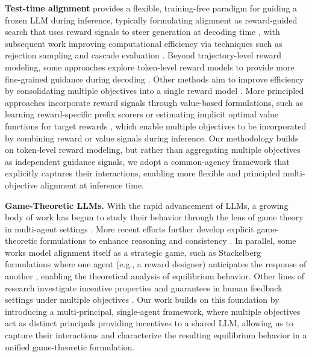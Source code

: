 \documentclass{article}
\begin{document}
\textbf{Test-time alignment} provides a flexible, training-free paradigm for guiding a frozen LLM during inference, typically formulating alignment as reward-guided search that uses reward signals to steer generation at decoding time \citep{khanovargs,huang2025deal}, with subsequent work improving computational efficiency via techniques such as rejection sampling and cascade evaluation \citep{li2024cascade}.
Beyond trajectory-level reward modeling, some approaches explore token-level reward models to provide more fine-grained guidance during decoding \citep{xu2024genarm,shi2024decoding}. Other methods aim to improve efficiency by consolidating multiple objectives into a single reward model \citep{lin2025parm,xie2026uniarm}. More principled approaches incorporate reward signals through value-based formulations, such as learning reward-specific prefix scorers \citep{mudgal2024controlled} or estimating implicit optimal value functions for target rewards \citep{chakraborty2024transfer}, which enable multiple objectives to be incorporated by combining reward or value signals during inference.
Our methodology builds on token-level reward modeling, but rather than aggregating multiple objectives as independent guidance signals, we adopt a common-agency framework that explicitly captures their interactions, enabling more flexible and principled multi-objective alignment at inference time.

\textbf{Game-Theoretic LLMs.}
With the rapid advancement of LLMs, a growing body of work has begun to study their behavior through the lens of game theory in multi-agent settings \citep{huang2024ensemble,chenincentivizing,chen2026survey}. More recent efforts further develop explicit game-theoretic formulations to enhance reasoning and consistency \citep{cheng2024self,kirchner2024prover,jacob2023consensus,zhu2026align}.
In parallel, some works model alignment itself as a strategic game, such as Stackelberg formulations where one agent (e.g., a reward designer) anticipates the response of another \citep{makar2024sta,chu2025stackelberg}, enabling the theoretical analysis of equilibrium behavior. Other lines of research investigate incentive properties and guarantees in human feedback settings under multiple objectives \citep{sun2024mechanism,bueningstrategyproof}. Our work builds on this foundation by introducing a multi-principal, single-agent framework, where multiple objectives act as distinct principals providing incentives to a shared LLM, allowing us to capture their interactions and characterize the resulting equilibrium behavior in a unified game-theoretic formulation.
\end{document}
